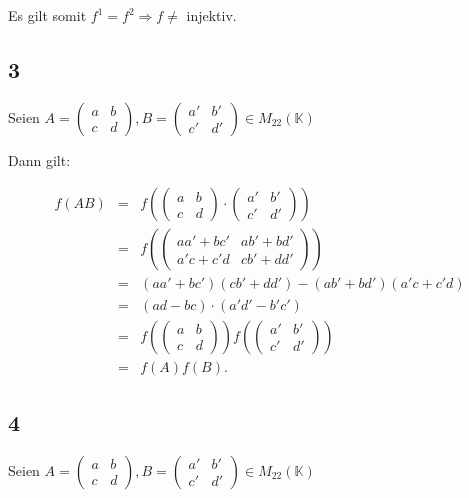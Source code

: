 \documentclass[12pt]{article}
\newcommand{\K}{\mathbb{K}}
\begin{document}
Es gilt somit $f^1 = f^2 \Rightarrow f \not=$ injektiv.

\subsection*{3}
Seien $A = \left( \begin{array}{ll} a & b \\ c & d   \end{array} \right), 
B = \left( \begin{array}{ll} a' & b' \\ c' & d'   \end{array} \right) \in M_{22}(\K)$

Dann gilt:

\begin{eqnarray*}
f(AB) &=& f( \left(  
    \begin{array}{ll} 
    a & b \\
    c & d   
    \end{array}\right)
    \cdot
    \left( 
    \begin{array}{ll} 
    a' & b' \\
    c' & d'  
    \end{array} \right)     
     )\\
    &=& f(
    \left( 
        \begin{array}{ll} 
        aa'+bc' & ab'+bd' \\
         a'c+c'd & cb'+dd'  
         \end{array} \right)  
     ) \\
     &=& (aa'+bc')(cb'+dd')-(ab'+bd')(a'c+c'd)\\
     &=&
     (ad - bc) \cdot (a'd' - b'c') \\
     &=&  f(
         \left(  
    \begin{array}{ll} a & b \\
     c & d   \end{array}\right) 
     )  f(
             \left( 
        \begin{array}{ll} 
        a' & b' \\
         c' & d'  
         \end{array} \right)     
     ) \\
     &=& f(A)f(B).
\end{eqnarray*}

\subsection*{4}
Seien $A = \left( \begin{array}{ll} a & b \\ c & d   \end{array} \right), 
B = \left( \begin{array}{ll} a' & b' \\ c' & d'   \end{array} \right) \in M_{22}(\K)$
\end{document}
